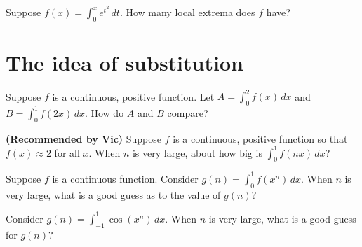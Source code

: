 \documentclass{ximera}
\newcommand{\recommendation}[1]{\textbf{(Recommended by #1)}}
\begin{document}
\begin{problem}
  Suppose $f(x) = \int_0^x e^{t^2} \, dt$.  How many local extrema does $f$ have?
  \begin{multipleChoice}
  \end{multipleChoice}
\end{problem}

\clearpage

\section{The idea of substitution}

\begin{problem}
  Suppose $f$ is a continuous, positive function.  Let $A = \int_0^2 f(x) \, dx$ and $B = \int_0^1 f(2x) \, dx$.  How do $A$ and $B$ compare?
  \begin{multipleChoice}
  \end{multipleChoice}
\end{problem}

\begin{problem}
\recommendation{Vic}
  Suppose $f$ is a continuous, positive function so that $f(x) \approx 2$ for all $x$.  When $n$ is very large, about how big is $\int_0^1 f(nx) \, dx$?
  \begin{multipleChoice}
   \end{multipleChoice}
\end{problem}

\begin{problem}
  Suppose $f$ is a continuous function.  Consider $g(n) = \int_0^1 f(x^n) \, dx$.  When $n$ is very large, what is a good guess as to the value of $g(n)$?
  \begin{multipleChoice}
  \end{multipleChoice}
\end{problem}

\begin{problem}
  Consider $g(n) = \int_{-1}^1 \cos(x^n) \, dx$.  When $n$ is very large, what is a good guess for $g(n)$?
  \begin{multipleChoice}
  \end{multipleChoice}
\end{problem}
\end{document}
